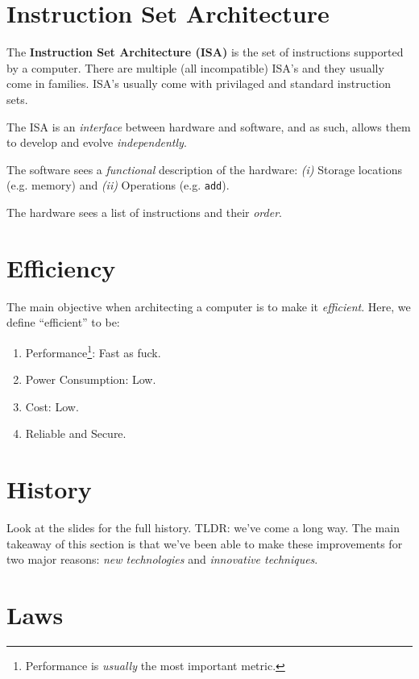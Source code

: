 \documentclass{report}
\newcommand{\definition}[2]{\begin{tcolorbox}[title={Definition: #1}]{#2}\end{tcolorbox}}
\begin{document}
\section{Instruction Set Architecture}
\definition{Instruction Set Architecture}{
  The \textbf{Instruction Set Architecture (ISA)} is the set of instructions supported by a
  computer. There are multiple (all incompatible) ISA's and they usually come in families. ISA's
  usually come with privilaged and standard instruction sets. 
}

The ISA is an \textit{interface} between hardware and software, and as such, allows them to develop
and evolve \textit{independently}.

The software sees a \textit{functional} description of the hardware: \textit{(i)} Storage locations
(e.g. memory) and \textit{(ii)} Operations (e.g. \texttt{add}).

The hardware sees a list of instructions and their \textit{order}.

\section{Efficiency}
The main objective when architecting a computer is to make it \textit{efficient}. Here, we define
``efficient'' to be:

\begin{enumerate}[label=\textit{(\roman*)}]
\item Performance\footnote{Performance is \textit{usually} the most important metric.}: Fast as
  fuck.
\item Power Consumption: Low.
\item Cost: Low.
\item Reliable and Secure.
\end{enumerate}





\section{History}
Look at the slides for the full history. TLDR: we've come a long way. The main takeaway of this
section is that we've been able to make these improvements for two major reasons: \textit{new
  technologies} and \textit{innovative techniques}.





\section{Laws}
\end{document}
